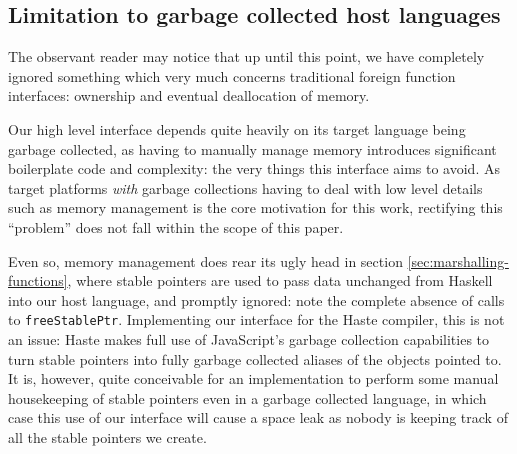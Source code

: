 \documentclass{sigplanconf}
\begin{document}
\subsection{Limitation to garbage collected host languages}
\label{sec:host-gc}
The observant reader may notice that up until this point, we have completely
ignored something which very much concerns traditional foreign function
interfaces: ownership and eventual deallocation of memory.

Our high level interface depends quite heavily on its target language being
garbage collected, as having to manually manage memory introduces significant
boilerplate code and complexity: the very things this interface aims to avoid.
As target platforms \emph{with} garbage collections having to deal with low
level details such as memory management is the core motivation for this work,
rectifying this ``problem'' does not fall within the scope of this paper.

Even so, memory management does rear its ugly head in section
\ref{sec:marshalling-functions}, where stable pointers are used to pass data
unchanged from Haskell into our host language, and promptly ignored: note
the complete absence of calls to \lstinline!freeStablePtr!. Implementing our
interface for the Haste compiler, this is not an issue: Haste makes full use
of JavaScript's garbage collection capabilities to turn stable pointers into
fully garbage collected aliases of the objects pointed to.
It is, however, quite conceivable for an implementation to perform some manual
housekeeping of stable pointers even in a garbage collected language, in which
case this use of our interface will cause a space leak as nobody is keeping
track of all the stable pointers we create.
\end{document}
